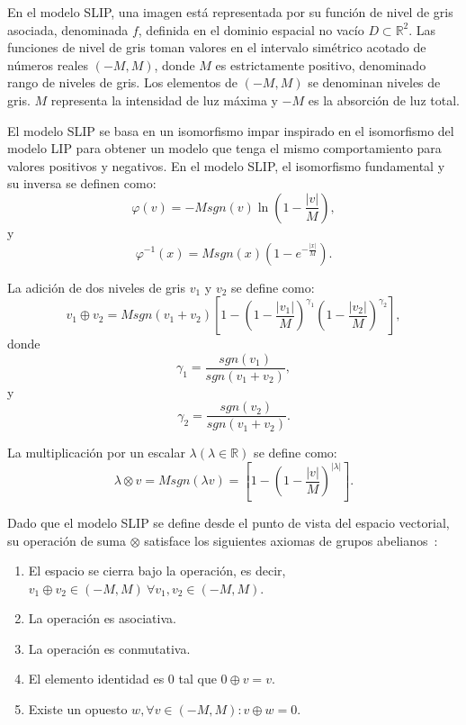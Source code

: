 En el modelo SLIP, una imagen está representada por su función de nivel de gris asociada, denominada $f$, definida en el dominio espacial no vacío $D \subset \mathbb{R}^2$. Las funciones de nivel de gris toman valores en el intervalo simétrico acotado de números reales $(-M, M)$, donde $M$ es estrictamente positivo, denominado rango de niveles de gris. Los elementos de $(-M, M )$ se denominan niveles de gris. $M$ representa la intensidad de luz máxima y $-M$ es la absorción de luz total.

El modelo SLIP se basa en un isomorfismo impar inspirado en el isomorfismo del modelo LIP para obtener un modelo que tenga el mismo comportamiento para valores positivos y negativos. En el modelo SLIP, el isomorfismo fundamental y su inversa se definen como:
\begin{equation}
	\varphi(v)=-Msgn(v)\ln\left(1-\frac{|v|}{M}\right),
\end{equation}
y
\begin{equation}
	\varphi^{-1}(x)=Msgn(x)\left(1-e^{-\frac{|x|}{M}}\right).
\end{equation}

La adición de dos niveles de gris $v_1$ y $v_2$ se define como:
\begin{equation}
	v_1\oplus v_2=Msgn(v_1+v_2)\left[1-\left(1-\frac{|v_1|}{M}\right)^{\gamma_1}\left(1-\frac{|v_2|}{M}\right)^{\gamma_2}\right],
\end{equation}
donde
\begin{equation}
	\gamma_1=\frac{sgn(v_1)}{sgn(v_1+v_2)},
\end{equation}
y
\begin{equation}
	\gamma_2=\frac{sgn(v_2)}{sgn(v_1+v_2)}.
\end{equation}

La multiplicación por un escalar $\lambda (\lambda \in \mathbb{R})$ se define como:
\begin{equation}
	\lambda \otimes v = Msgn(\lambda v)=\left[1-\left(1-\frac{|v|}{M}\right)^{|\lambda|}\right].
\end{equation}

Dado que el modelo SLIP se define desde el punto de vista del espacio vectorial, su operación de suma $\otimes$ satisface los siguientes axiomas de grupos abelianos~\cite{navarro2013symmetric}:

\begin{enumerate}
	\item El espacio se cierra bajo la operación, es decir, $v_1\oplus v_2 \in (-M, M )~\forall v_1, v_2 \in (-M, M )$.
	\item La operación es asociativa.
	\item La operación es conmutativa.
	\item El elemento identidad es $0$ tal que $0\oplus v = v$.
	\item  Existe un opuesto $w, \forall v \in (-M, M ): v \oplus w = 0$.
\end{enumerate}
  
